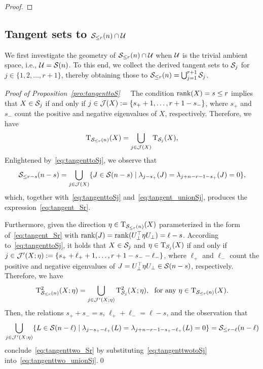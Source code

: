 \begin{proof}
\end{proof}



\subsection{Tangent sets to $\mathcal{S}_{\le r}(n)\cap\mathcal{U}$}\label{app:SU}
We first investigate the geometry of $\mathcal{S}_{\le r}(n)\cap\mathcal{U}$ when $\mathcal{U}$ is the trivial ambient space, i.e., $\mathcal{U}=\mathcal{S}(n)$. To this end, we collect the derived tangent sets to $\mathcal{S}_j$ for $j\in\{1,2,\ldots,r+1\}$, thereby obtaining those to $\mathcal{S}_{\le r}(n)=\bigcup_{j=1}^{r+1}\mathcal{S}_j$.

\vspace{1mm}

\noindent\textit{Proof of Proposition~\ref{pro:tangenttoS}}\ \ \ The condition $\operatorname{rank}(X)=s\le r$ implies that $X\in \mathcal{S}_j$ if and only if $j\in \mathcal{J}(X):=\{s_++1, \ldots, r+1 -s_-\}$, where $s_+$ and $s_-$ count the positive and negative eigenvalues of $X$, respectively. Therefore, we have
\begin{align}
        \mathrm{T}_{\mathcal{S}_{\le r}(n)}(X) = \bigcup_{j\in \mathcal{J}(X)}\mathrm{T}_{\mathcal{S}_j}(X),    \label{eq:tangent_unionSj}
\end{align}
Enlightened by~\eqref{eq:tangenttoSj}, we observe that
\begin{equation*}
    \mathcal{S}_{\le r-s}(n-s) = \bigcup_{j\in\mathcal{J}(X)}\{J\in\mathcal{S}(n-s)\mid \lambda_{j-s_+}(J)=\lambda_{j+n-r-1-s_+}(J)=0\},
\end{equation*}
which, together with~\eqref{eq:tangenttoSj} and~\eqref{eq:tangent_unionSj}, produces the expression~\eqref{eq:tangent_Sr}.


Furthermore, given the direction $\eta\in\mathrm{T}_{\mathcal{S}_{\le r}(n)}(X)$ parameterized in the form of~\eqref{eq:tangent_Sr} with $\operatorname{rank}(J)=\operatorname{rank}(U^\top_\bot \eta U_\bot)=\ell-s$. According to~\eqref{eq:tangenttoSj}, it holds that $X\in\mathcal{S}_j$ and $\eta\in\mathrm{T}_{\mathcal{S}_j}(X)$ if and only if $j\in\mathcal{J}^\prime(X;\eta):=\{s_++\ell_++1,\ldots,r+1-s_--\ell_-\}$, where $\ell_+$ and $\ell_-$ count the positive and negative eigenvalues of $J=U^\top_\bot \eta U_\bot\in\mathcal{S}(n-s)$, respectively. Therefore, we have
\begin{equation}\label{eq:tangenttwo_unionSj}
    \mathrm{T}^2_{\mathcal{S}_{\le r}(n)}(X;\eta) = \bigcup_{j\in \mathcal{J}^\prime(X;\eta)}\mathrm{T}^2_{\mathcal{S}_j}(X;\eta),\ \ \text{for any}\ \eta\in\mathrm{T}_{\mathcal{S}_{\le r}(n)}(X).
\end{equation}
Then, the relations $s_++s_-=s$, $\ell_+ + \ell_- =\ell-s $, and the observation that
\begin{equation*}
    \bigcup_{j\in\mathcal{J}^\prime(X;\eta)}\{L\in\mathcal{S}(n-\ell)\mid \lambda_{j-s_+-\ell_+}(L)=\lambda_{j+n-r-1-s_+-\ell_+}(L)=0\} = \mathcal{S}_{\le r-\ell}(n-\ell)
\end{equation*}
conclude~\eqref{eq:tangenttwo_Sr} by substituting~\eqref{eq:tangenttwotoSj} into~\eqref{eq:tangenttwo_unionSj}.\qed


